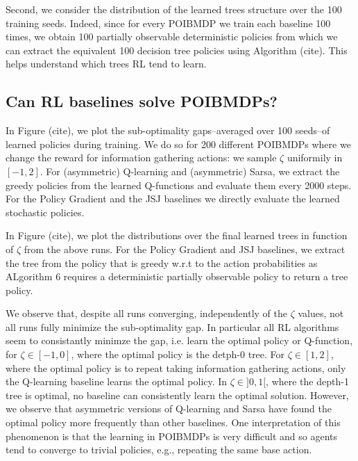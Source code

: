 Second, we consider the distribution of the learned trees structure over the 100 training seeds.
Indeed, since for every POIBMDP we train each baseline 100 times, we obtain 100 partially observable deterministic policies from which we can extract the equivalent 100 decision tree policies using Algorithm (cite).
This helps understand which trees RL tend to learn.

\subsection{Can RL baselines solve POIBMDPs?}

In Figure (cite), we plot the sub-optimality gaps--averaged over 100 seeds--of learned policies during training.
We do so for 200 different POIBMDPs where we change the reward for information gathering actions: we sample $\zeta$ uniformily in $[-1, 2]$.
For (asymmetric) Q-learning and (asymmetric) Sarsa, we extract the greedy policies from the learned Q-functions and evaluate them every 2000 steps.
For the Policy Gradient and the JSJ baselines we directly evaluate the learned stochastic policies.

In Figure (cite), we plot the distributions over the final learned trees in function of $\zeta$ from the above runs.
For the Policy Gradient and JSJ baselines, we extract the tree from the policy that is greedy w.r.t to the action probabilities as ALgorithm 6 requires a deterministic partially observable policy to return a tree policy.

We observe that, despite all runs converging, independently of the $\zeta$ values, not all runs fully minimize the sub-optimality gap.
In particular all RL algorithms seem to consistantly minimze the gap, i.e. learn the optimal policy or Q-function, for $\zeta \in [-1, 0]$, where the optimal policy is the detph-0 tree.
For $\zeta \in [1, 2]$, where the optimal policy is to repeat taking information gathering actions, only the Q-learning baseline learns the optimal policy. 
In $\zeta \in ]0, 1[$, where the depth-1 tree is optimal, no baseline can consistently learn the optimal solution. However, we observe that asymmetric versions of Q-learning and Sarsa have found the optimal policy more frequently than other baselines.
One interpretation of this phenomenon is that the learning in POIBMDPs is very difficult and so agents tend to converge to trivial policies, e.g., repeating the same base action.

